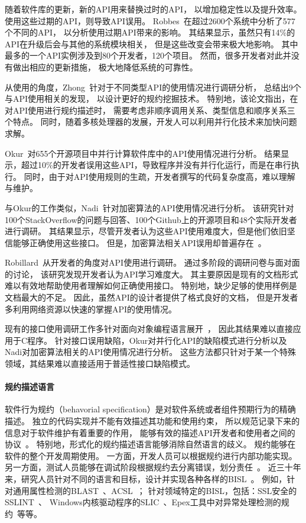 随着软件库的更新，新的API用来替换过时的API，
以增加稳定性以及提升效率。
使用这些过期的API，则导致API误用。
Robbes~\cite{12-fse-deprecation, 18-sqj-evolution}在超过2600个系统中分析了577个不同的API，
以分析使用过期API带来的影响。
其结果显示，虽然只有14\%的API在升级后会与其他的系统模块相关，
但是这些改变会带来极大地影响。
其中最多的一个API实例涉及到80个开发者，120个项目。
然而，很多开发者对此并没有做出相应的更新措施，
极大地降低系统的可靠性。

从使用的角度，Zhong~\cite{17-tse-survey}针对于不同类型API的使用情况进行调研分析，
总结出9个与API使用相关的发现，
以设计更好的规约挖掘技术。
特别地，该论文指出，在对API使用进行规约描述时，
需要考虑非顺序调用关系、类型信息和顺序关系三个特点。
同时，随着多核处理器的发展，开发人可以利用并行化技术来加快问题求解。

Okur~\cite{12-fse-parallel}对655个开源项目中并行计算软件库中的API使用情况进行分析。
结果显示，超过10\%的开发者误用这些API，导致程序并没有并行化运行，而是在串行执行。
同时，由于对API使用规则的生疏，开发者撰写的代码复杂度高，难以理解与维护。

与Okur的工作类似，Nadi~\cite{16-icse-cry}针对加密算法的API使用情况进行分析。
该研究针对100个StackOverflow的问题与回答、100个Github上的开源项目和48个实际开发者进行调研。
其结果显示，尽管开发者认为这些API使用难度大，但是他们依旧坚信能够正确使用这些接口。
但是，加密算法相关API误用却普遍存在~\cite{13-ccs-misuse}。

Robillard~\cite{11-ese-learning}从开发者的角度对API使用进行调研。
通过多阶段的调研问卷与面对面的讨论，
该研究发现开发者认为API学习难度大。
其主要原因是现有的文档形式难以有效地帮助使用者理解如何正确使用接口。
特别地，缺少足够的使用样例是文档最大的不足。
因此，虽然API的设计者提供了格式良好的文档，
但是开发者多利用网络资源以快速的掌握API的使用情况。

现有的接口使用调研工作多针对面向对象编程语言展开~\cite{16-icse-cry,17-tse-survey, 12-fse-parallel,12-fse-deprecation}，
因此其结果难以直接应用于C程序。
针对接口误用缺陷，Okur对并行化API的缺陷模式进行分析以及
Nadi对加密算法相关的API使用情况进行分析。
这些方法都只针对于某一个特殊领域，其结果难以直接适用于普适性接口缺陷模式。


\paragraph{规约描述语言}
软件行为规约（behavorial specification）是对软件系统或者组件预期行为的精确描述。
独立的代码实现并不能有效描述其功能和使用约束，
所以规范记录下来的信息对于软件维护有着重要的作用，
能够有效的描述API开发者和使用者之间的协议~\cite{92-ieee-contract}。
特别地，形式化的规约描述语言能够消除自然语言的歧义。
规约能够在软件的整个开发周期使用。
一方面，开发人员可以根据规约进行内部功能实现。
另一方面，测试人员能够在调试阶段根据规约去分离错误，划分责任~\cite{05-vstte-spec}。
近三十年来，研究人员针对不同的语言和目标，设计并实现各种各样的BISL~\cite{survey12}。
例如，针对通用属性检测的BLAST~\cite{blast}、ACSL~\cite{acsl}；
针对领域特定的BISL，包括：SSL安全的SSLINT~\cite{15-sp-sslint}、
Windows内核驱动程序的SLIC~\cite{01-slic}、Epex工具中对异常处理检测的规约~\cite{16-sec-epex}等等。


